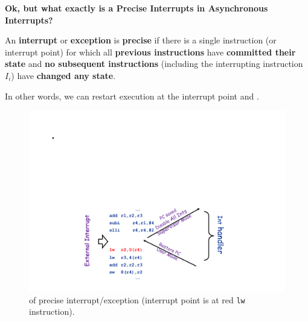 \begin{flushleft}
    \textcolor{Green4}{ \textbf{Ok, but what exactly is a Precise Interrupts in Asynchronous Interrupts?}}
\end{flushleft} 
An \textbf{interrupt} or \textbf{exception} is \textbf{precise} if there is a single instruction (or interrupt point) for which all \textbf{previous instructions} have \textbf{committed their state} and \textbf{no subsequent instructions} (including the interrupting instruction $I_{i}$) have \textbf{changed any state}.

\highspace
In other words, we can restart execution at the interrupt point and .

\begin{figure}[!htp]
    \centering
    \includegraphics[width=.8\textwidth]{img/precise-interrupts-1.pdf}
    \caption{ of precise interrupt/exception (interrupt point is at red \texttt{lw} instruction).}
\end{figure}